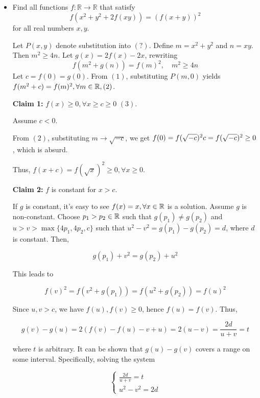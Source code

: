 \documentclass[11pt]{scrartcl}
\begin{document}
\begin{itemize}[label=, leftmargin=0em, itemsep=0.2em]
    \item \begin{bt}
        Find all functions $f: \mathbb{R} \to \mathbb{R}$ that satisfy
        \[
           f(x^2 + y^2 +2f(xy)) = \left(f(x + y)\right)^2
        \]
        for all real numbers $x,y$.
    \end{bt}
    \begin{sol}
        Let \( P(x,y) \) denote substitution into \( (?) \). Define \( m = x^2 + y^2 \) and \( n = xy \). Then \( m^2 \geq 4n \). Let \( g(x) = 2f(x) - 2x \), rewriting 
\[
    f(m^2 + g(n)) = f(m)^2, \quad m^2 \geq 4n \tag{1}
\]
Let \( c = f(0) = g(0) \). From \( (1) \), substituting \( P(m,0) \) yields \( f(m^2 + c) = f(m)^2, \forall m \in \mathbb{R}, (2) \).

\textbf{Claim 1:} \( f(x) \geq 0, \forall x \geq c \geq 0 \) \( (3) \).

\begin{pro}
Assume \( c < 0 \).

From \( (2) \), substituting \( m \to \sqrt{-c} \), we get \( f(0) = f(\sqrt{-c})^2 \ra c = f(\sqrt{-c})^2 \geq 0 \), which is absurd.

Thus, \( f(x + c) = f(\sqrt{x})^2 \geq 0, \forall x \geq 0 \).
\end{pro}

\textbf{Claim 2:} \( f \) is constant for \( x > c \).

\begin{pro}
If \( g \) is constant, it's easy to see \( f(x) = x, \forall x\in \mathbb{R} \) is a solution. Assume \( g \) is non-constant. Choose \( p_1 > p_2 \in \mathbb{R} \) such that \( g(p_1) \neq g(p_2) \) and \( u > v > \max\{4p_1,4p_2,c\} \) such that \( u^2 - v^2 = g(p_1) - g(p_2) = d \), where \( d \) is constant. Then,

\[
    g(p_1) + v^2 = g(p_2) + u^2
\]

This leads to

\[
    f(v)^2 = f(v^2 + g(p_1)) = f(u^2 + g(p_2)) = f(u)^2
\]

Since \( u, v > c \), we have \( f(u), f(v) \geq 0 \), hence \( f(u) = f(v) \). Thus,

\[
    g(v) - g(u) = 2(f(v) - f(u) - v + u) = 2(u - v) = \frac{2d}{u + v} = t
\]

where \( t \) is arbitrary. It can be shown that \( g(u) - g(v) \) covers a range on some interval. Specifically, solving the system

\[
    \left\{
    \begin{array}{l}
    \frac{2d}{u + v} = t \\
    u^2 - v^2 = 2d
    \end{array}
    \right.
\]


\end{pro}
\end{sol}
\end{itemize}
\end{document}
